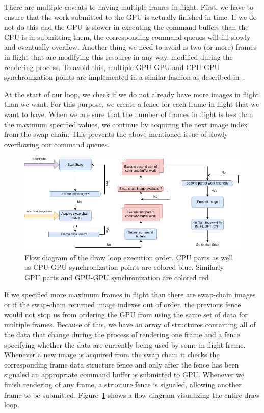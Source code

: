 \documentclass{ctuthesis}
\begin{document}
There are multiple caveats to having multiple frames in flight. First, we have to ensure
that the work submitted to the GPU is actually finished in time. If we do not do this and the GPU
is slower in executing the command buffers than the CPU is in submitting them, the corresponding
command queues will fill slowly and eventually overflow. Another thing we need to avoid is two (or more)
frames in flight that are modifying this resource in any way. 
modified during the rendering process. To avoid this, multiple GPU-GPU and CPU-GPU synchronization
points are implemented in a similar fashion as described in~\cite{overvoorde_2021}.

At the start of our loop, we check if we do not already have more images in flight than we
want. For this purpose, we create a fence for each frame in flight that we want to have. When we are
sure that the number of frames in flight is less than the maximum specified values, we continue by
acquiring the next image index from the swap chain. This prevents the above-mentioned issue of 
slowly overflowing our command queues.

\begin{figure}
    \centering
    \includegraphics[width=1.0\textwidth]{media/Thesis_main_draw_loop.png}
    \caption[Main loop flow diagram]{Flow diagram of the draw loop execution order. CPU parts as well as CPU-GPU synchronization
    points are colored blue. Similarly GPU parts and GPU-GPU synchronization are colored red}
    \label{fig:main loop exec diag}
\end{figure}

If we specified more maximum frames in flight than there are swap-chain images or if the swap-chain
returned image indexes out of order, the previous fence would not stop us from 
ordering the GPU from using the same set of data for multiple frames. Because of this, we have an
array of structures containing all of the data that change during the process of
rendering one frame and a fence specifying whether the data are currently being used by some
in flight frame. Whenever a new image is acquired from the swap chain it checks the 
corresponding frame data structure fence and only after the fence has been signaled an appropriate
command buffer is submitted to GPU. Whenever we finish rendering of any frame, a structure 
fence is signaled, allowing another frame to be submitted. Figure~\ref{fig:main loop exec diag} shows
a flow diagram visualizing the entire draw loop.
\end{document}
